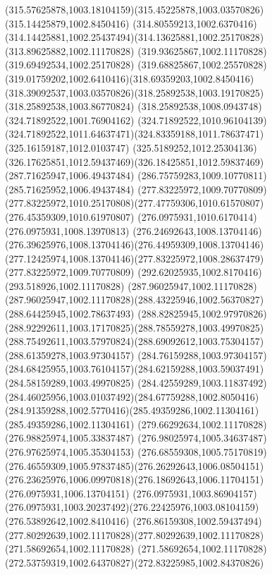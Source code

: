 {{\curveto(315.57625878,1003.18104159)(315.45225878,1003.03570826)(315.14425879,1002.8450416)
\curveto(314.80559213,1002.6370416)(314.14425881,1002.25437494)(314.13625881,1002.25170828)
\lineto(313.89625882,1002.11170828)
\lineto(319.93625867,1002.11170828)
\lineto(319.69492534,1002.25170828)
\curveto(319.68825867,1002.25570828)(319.01759202,1002.6410416)(318.69359203,1002.8450416)
\curveto(318.39092537,1003.03570826)(318.25892538,1003.19170825)(318.25892538,1003.86770824)
\lineto(318.25892538,1008.0943748)
\lineto(324.71892522,1001.76904162)
\lineto(324.71892522,1010.96104139)
\curveto(324.71892522,1011.64637471)(324.83359188,1011.78637471)(325.16159187,1012.0103747)
\curveto(325.5189252,1012.25304136)(326.17625851,1012.59437469)(326.18425851,1012.59837469)
\closepath
\moveto(287.71625947,1006.49437484)
\lineto(286.75759283,1009.10770811)
\lineto(285.71625952,1006.49437484)
\closepath
\moveto(277.83225972,1009.70770809)
\curveto(277.83225972,1010.25170808)(277.47759306,1010.61570807)(276.45359309,1010.61970807)
\lineto(276.0975931,1010.6170414)
\lineto(276.0975931,1008.13970813)
\curveto(276.24692643,1008.13704146)(276.39625976,1008.13704146)(276.44959309,1008.13704146)
\curveto(277.12425974,1008.13704146)(277.83225972,1008.28637479)(277.83225972,1009.70770809)
\moveto(292.62025935,1002.8170416)
\lineto(293.518926,1002.11170828)
\lineto(287.96025947,1002.11170828)
\curveto(287.96025947,1002.11170828)(288.43225946,1002.56370827)(288.64425945,1002.78637493)
\curveto(288.82825945,1002.97970826)(288.92292611,1003.17170825)(288.78559278,1003.49970825)
\curveto(288.75492611,1003.57970824)(288.69092612,1003.75304157)(288.61359278,1003.97304157)
\lineto(284.76159288,1003.97304157)
\curveto(284.68425955,1003.76104157)(284.62159288,1003.59037491)(284.58159289,1003.49970825)
\curveto(284.42559289,1003.11837492)(284.46025956,1003.01037492)(284.67759288,1002.8050416)
\curveto(284.91359288,1002.5770416)(285.49359286,1002.11304161)(285.49359286,1002.11304161)
\lineto(279.66292634,1002.11170828)
\lineto(276.98825974,1005.33837487)
\lineto(276.98025974,1005.34637487)
\lineto(276.97625974,1005.35304153)
\curveto(276.68559308,1005.75170819)(276.46559309,1005.97837485)(276.26292643,1006.08504151)
\curveto(276.23625976,1006.09970818)(276.18692643,1006.11704151)(276.0975931,1006.13704151)
\lineto(276.0975931,1003.86904157)
\curveto(276.0975931,1003.20237492)(276.22425976,1003.08104159)(276.53892642,1002.8410416)
\curveto(276.86159308,1002.59437494)(277.80292639,1002.11170828)(277.80292639,1002.11170828)
\lineto(271.58692654,1002.11170828)
\curveto(271.58692654,1002.11170828)(272.53759319,1002.64370827)(272.83225985,1002.84370826)
}}
